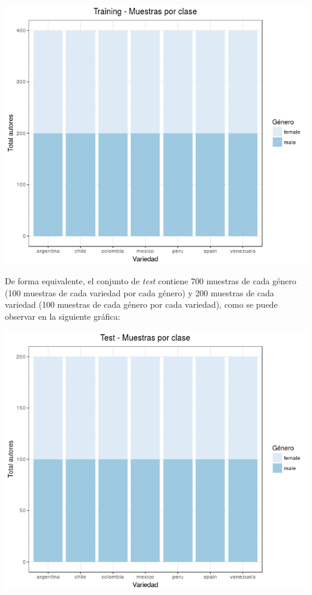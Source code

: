 \documentclass[11pt,a4paper]{article}
\begin{document}
\begin{center}
\includegraphics[width=\linewidth]{total_tweets_training.png}
\end{center}

De forma equivalente, el conjunto de \textit{test} contiene 700 muestras de cada g\'enero (100 muestras de cada variedad por cada g\'enero) y 200 muestras de cada variedad (100 muestras de cada g\'enero por cada variedad), como se puede observar en la siguiente gr\'afica:

\begin{center}
\includegraphics[width=\linewidth]{total_tweets_test.png}
\end{center}
\end{document}
